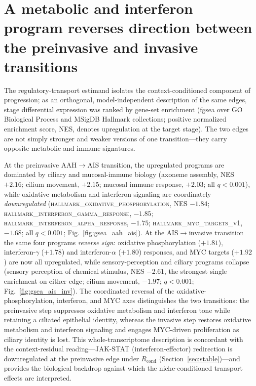 \section{A metabolic and interferon program reverses direction between the preinvasive and invasive transitions}
\label{sec:gsea}

The regulatory-transport estimand isolates the context-conditioned component of progression; as an
orthogonal, model-independent description of the same edges, stage differential expression was ranked
by gene-set enrichment (fgsea over GO Biological Process and MSigDB Hallmark collections; positive
normalized enrichment score, NES, denotes upregulation at the target stage). The two edges are not
simply stronger and weaker versions of one transition---they carry opposite metabolic and immune
signatures.

At the preinvasive AAH$\rightarrow$AIS transition, the upregulated programs are dominated by ciliary and
mucosal-immune biology (axoneme assembly, NES $+2.16$; cilium movement, $+2.15$; mucosal immune
response, $+2.03$; all $q<0.001$), while oxidative metabolism and interferon signaling are
coordinately \emph{downregulated} (\textsc{hallmark\_oxidative\_phosphorylation}, NES $-1.84$;
\textsc{hallmark\_interferon\_gamma\_response}, $-1.85$; \textsc{hallmark\_interferon\_alpha\_response},
$-1.75$; \textsc{hallmark\_myc\_targets\_v1}, $-1.68$; all $q<0.001$; Fig.~\ref{fig:gsea_aah_ais}).
At the AIS$\rightarrow$invasive transition the same four programs \emph{reverse sign}: oxidative
phosphorylation ($+1.81$), interferon-$\gamma$ ($+1.78$) and interferon-$\alpha$ ($+1.80$) responses,
and MYC targets ($+1.92$) are now all upregulated, while sensory-perception and ciliary programs
collapse (sensory perception of chemical stimulus, NES $-2.61$, the strongest single enrichment on
either edge; cilium movement, $-1.97$; $q<0.001$; Fig.~\ref{fig:gsea_ais_inv}). The coordinated
reversal of the oxidative-phosphorylation, interferon, and MYC axes distinguishes the two transitions:
the preinvasive step suppresses oxidative metabolism and interferon tone while retaining a ciliated
epithelial identity, whereas the invasive step restores oxidative metabolism and interferon signaling
and engages MYC-driven proliferation as ciliary identity is lost. This whole-transcriptome
description is concordant with the context-residual reading---JAK-STAT (interferon-effector) redirection
is downregulated at the preinvasive edge under $R_{\text{cond}}$ (Section~\ref{sec:stable})---and
provides the biological backdrop against which the niche-conditioned transport effects are interpreted.

